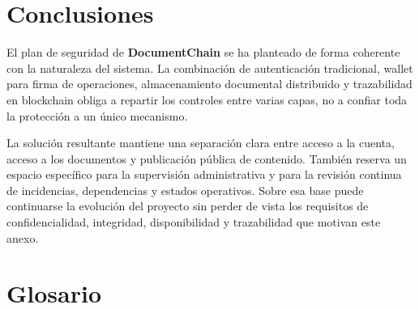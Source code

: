 \documentclass[11pt, a4paper]{article}
\begin{document}
\section{Conclusiones}

El plan de seguridad de \textbf{DocumentChain} se ha planteado de forma coherente con la naturaleza del sistema. La combinación de autenticación tradicional, wallet para firma de operaciones, almacenamiento documental distribuido y trazabilidad en blockchain obliga a repartir los controles entre varias capas, no a confiar toda la protección a un único mecanismo.

La solución resultante mantiene una separación clara entre acceso a la cuenta, acceso a los documentos y publicación pública de contenido. También reserva un espacio específico para la supervisión administrativa y para la revisión continua de incidencias, dependencias y estados operativos. Sobre esa base puede continuarse la evolución del proyecto sin perder de vista los requisitos de confidencialidad, integridad, disponibilidad y trazabilidad que motivan este anexo.

\section{Glosario}
\end{document}
